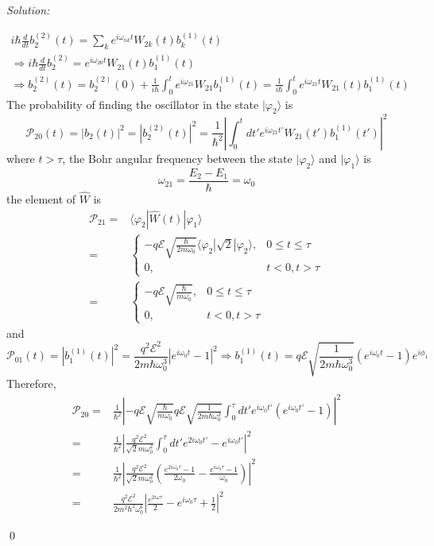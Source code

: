\documentclass[10pt,a4paper]{article}
\newenvironment{sol}
    {\emph{Solution:}
    }
    {
    \qed
    }
\begin{document}
\begin{sol}
\begin{itemize}
\begin{gather}
i\hbar\frac{d}{dt}b_2^{(2)}(t)=\sum_ke^{i\omega_{nk}t}W_{2k}(t)b_k^{(1)}(t)\\
\Longrightarrow i\hbar\frac{d}{dt}b_2^{(2)}=e^{i\omega_{20}t}W_{21}(t)b_1^{(1)}(t)\\
\Longrightarrow b_2^{(2)}(t)=b_2^{(2)}(0)+\frac{1}{i\hbar}\int_0^te^{i\omega_{21}}W_{21}b_1^{(1)}(t)=\frac{1}{i\hbar}\int_0^te^{i\omega_{21}t}W_{21}(t)b_1^{(1)}(t)
\end{gather}
The probability of finding the oscillator in the state $|\varphi_2\rangle$ is
\begin{equation}
\mathscr{P}_{20}(t)=|b_2(t)|^2=|b_2^{(2)}(t)|^2=\frac{1}{\hbar^2}\left|\int_0^tdt'e^{i\omega_{21}t'}W_{21}(t')b_1^{(1)}(t')\right|^2
\end{equation}
where $t>\tau$, the Bohr angular frequency between the state $|\varphi_2\rangle$ and $|\varphi_1\rangle$ is
\begin{equation}
\omega_{21}=\frac{E_2-E_1}{\hbar}=\omega_0
\end{equation}
the element of $\hat{W}$ is
\begin{align}
\nonumber\mathscr{P}_{21}=&\langle\varphi_2|\hat{W}(t)|\varphi_1\rangle\\
\nonumber=&\left\{\begin{array}{ll}
-q\mathscr{E}\sqrt{\frac{\hbar}{2m\omega_0}}\langle\varphi_2|\sqrt{2}|\varphi_2\rangle,&0\leq t\leq\tau\\
0,&t<0,t>\tau
\end{array}\right.\\
=&\left\{\begin{array}{ll}
-q\mathscr{E}\sqrt{\frac{\hbar}{m\omega_0}},&0\leq t\leq\tau\\
0,&t<0,t>\tau
\end{array}\right.
\end{align}
and
\begin{equation}
\mathscr{P}_{01}(t)=|b_1^{(1)}(t)|^2=\frac{q^2\mathscr{E}^2}{2m\hbar\omega_0^3}\left|e^{i\omega_0t}-1\right|^2\Longrightarrow b_1^{(1)}(t)=q\mathscr{E}\sqrt{\frac{1}{2m\hbar\omega_0^3}}(e^{i\omega_0t}-1)e^{i\phi_1}
\end{equation}
Therefore,
\begin{align}
\nonumber\mathscr{P}_{20}=&\frac{1}{\hbar^2}\left|-q\mathscr{E}\sqrt{\frac{\hbar}{m\omega_0}}q\mathscr{E}\sqrt{\frac{1}{2m\hbar\omega_0^3}}\int_0^{\tau}dt'e^{i\omega_0t'}(e^{i\omega_0t'}-1)\right|^2\\
\nonumber=&\frac{1}{\hbar^2}\left|\frac{q^2\mathscr{E}^2}{\sqrt{2}m\omega_0^2}\int_0^{\tau}dt'e^{2i\omega_0t'}-e^{i\omega_0t'}\right|^2\\
\nonumber=&\frac{1}{\hbar^2}\left|\frac{q^2\mathscr{E}^2}{\sqrt{2}m\omega_0^2}\left(\frac{e^{2i\omega_0\tau}-1}{2\omega_0}-\frac{e^{i\omega_0\tau}-1}{\omega_0}\right)\right|^2\\
=&\frac{q^2\mathscr{E}^2}{2m^2\hbar^2\omega_0^6}\left|\frac{e^{2i\omega\tau}}{2}-e^{i\omega_0\tau}+\frac{1}{2}\right|^2
\end{align}
\end{itemize}
\end{sol}
\end{document}
